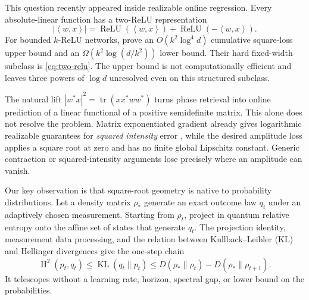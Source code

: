 \documentclass[twoside]{article}
\newcommand{\tr}{\operatorname{tr}}
\newcommand{\KL}{\operatorname{KL}}
\newcommand{\Hsq}{\operatorname{H}^2}
\newcommand{\ip}[2]{\left\langle #1,#2\right\rangle}
\begin{document}
This question recently appeared inside realizable online regression. Every absolute-linear function has a two-ReLU representation
\begin{equation}
|\ip{w}{x}|=\operatorname{ReLU}(\ip{w}{x})+\operatorname{ReLU}(-\ip{w}{x}).
\label{eq:two-relu}
\end{equation}
For bounded $k$-ReLU networks, \citet{doronarad2026online} prove an $O(k^2\log^4 d)$ cumulative square-loss upper bound and an $\Omega(k^2\log(d/k^2))$ lower bound. Their hard fixed-width subclass is \eqref{eq:two-relu}. The upper bound is not computationally efficient and leaves three powers of $\log d$ unresolved even on this structured subclass.

The natural lift $|w^*x|^2=\tr(xx^*ww^*)$ turns phase retrieval into online prediction of a linear functional of a positive semidefinite matrix. This alone does not resolve the problem. Matrix exponentiated gradient already gives logarithmic realizable guarantees for \emph{squared intensity} error \citep{tsuda2005matrix}, while the desired amplitude loss applies a square root at zero and has no finite global Lipschitz constant. Generic contraction or squared-intensity arguments lose precisely where an amplitude can vanish.

Our key observation is that square-root geometry is native to probability distributions. Let a density matrix $\rho_*$ generate an exact outcome law $q_t$ under an adaptively chosen measurement. Starting from $\rho_t$, project in quantum relative entropy onto the affine set of states that generate $q_t$. The projection identity, measurement data processing, and the relation between Kullback--Leibler (KL) and Hellinger divergences give the one-step chain
\begin{equation}
\Hsq(p_t,q_t)\leq\KL(q_t\|p_t)
\leq D(\rho_*\|\rho_t)-D(\rho_*\|\rho_{t+1}).
\label{eq:intro-chain}
\end{equation}
It telescopes without a learning rate, horizon, spectral gap, or lower bound on the probabilities.
\end{document}

